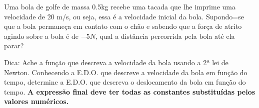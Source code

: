 \linespread{1.5}
Uma bola de golfe de massa 0.5kg recebe uma tacada que lhe imprime uma velocidade de 20 m/s, ou seja, essa é a velocidade inicial da bola. Supondo=se que a bola permaneça em contato com o chão e sabendo que a força de atrito agindo sobre a bola é de $-5N$, qual a distância percorrida pela bola até ela parar? 

Dica: Ache a função que descreva a velocidade da bola usando a 2ª lei de Newton. Conhecendo a E.D.O. que descreve a velocidade da bola em função do tempo, determine a E.D.O. que descreva o deslocamento da bola em função do tempo. \textbf{A expressão final deve ter todas as constantes substituídas pelos valores numéricos.}